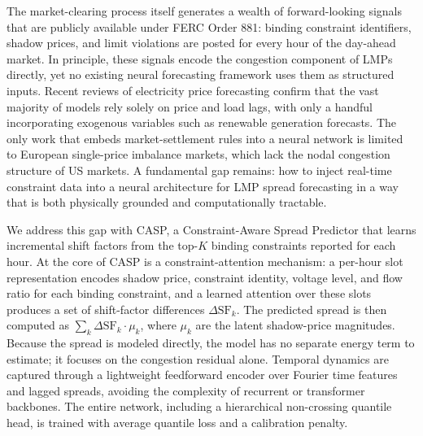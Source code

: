 \documentclass{article}
\begin{document}
The market-clearing process itself generates a wealth of forward-looking signals that are publicly available under FERC Order 881: binding constraint identifiers, shadow prices, and limit violations are posted for every hour of the day-ahead market. In principle, these signals encode the congestion component of LMPs directly, yet no existing neural forecasting framework uses them as structured inputs. Recent reviews of electricity price forecasting \cite{lago2020forecasting, olivares2022neural} confirm that the vast majority of models rely solely on price and load lags, with only a handful incorporating exogenous variables such as renewable generation forecasts. The only work that embeds market-settlement rules into a neural network \cite{yu2026marketruleinformed} is limited to European single-price imbalance markets, which lack the nodal congestion structure of US markets. A fundamental gap remains: how to inject real-time constraint data into a neural architecture for LMP spread forecasting in a way that is both physically grounded and computationally tractable.

We address this gap with CASP, a Constraint-Aware Spread Predictor that learns incremental shift factors from the top-$K$ binding constraints reported for each hour. At the core of CASP is a constraint-attention mechanism: a per-hour slot representation encodes shadow price, constraint identity, voltage level, and flow ratio for each binding constraint, and a learned attention over these slots produces a set of shift-factor differences $\Delta\mathrm{SF}_k$. The predicted spread is then computed as $\sum_k \Delta\mathrm{SF}_k \cdot \mu_k$, where $\mu_k$ are the latent shadow-price magnitudes. Because the spread is modeled directly, the model has no separate energy term to estimate; it focuses on the congestion residual alone. Temporal dynamics are captured through a lightweight feedforward encoder over Fourier time features and lagged spreads, avoiding the complexity of recurrent or transformer backbones. The entire network, including a hierarchical non-crossing quantile head, is trained with average quantile loss and a calibration penalty.
\end{document}
